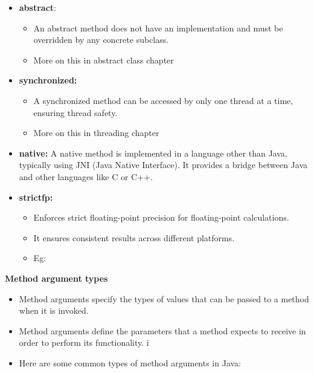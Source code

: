 \begin{flushleft}
\begin{itemize}
		\bigskip
		\item \textbf{abstract}:
		\begin{itemize}
			\item An abstract method does not have an implementation and must be overridden by any concrete subclass.
			\item More on this in abstract class chapter
		\end{itemize}
		\bigskip
		\item \textbf{synchronized:}
		\begin{itemize}
			\item A synchronized method can be accessed by only one thread at a time, ensuring thread safety.
			\item More on this in threading chapter
		\end{itemize}
		\bigskip
		\item \textbf{native:} A native method is implemented in a language other than Java, typically using JNI (Java Native Interface). It provides a bridge between Java and other languages like C or C++.
		\bigskip
		\item \textbf{strictfp:} 
		\begin{itemize}
			\item Enforces strict floating-point precision for floating-point calculations. 
			\item It ensures consistent results across different platforms.
			\item Eg:
			\bigskip
			\bigskip
			
		\end{itemize}
	
	\end{itemize}
	
	\newpage
	
	\textbf{Method argument types}
	\begin{itemize}
		\item Method arguments specify the types of values that can be passed to a method when it is invoked. 
		\item Method arguments define the parameters that a method expects to receive in order to perform its functionality. 
		i\item Here are some common types of method arguments in Java:
		

\end{itemize}
\end{flushleft}
